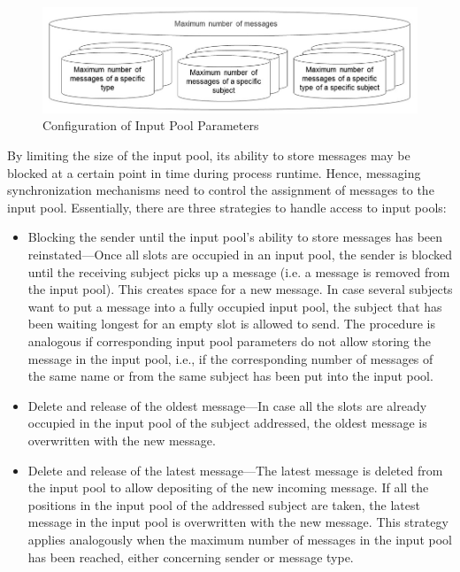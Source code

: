 \begin{figure}[htbp]
	\centering
	\includegraphics[width=12cm]{Figures/Ontology/SubjectInteraction/input-pool-informal.jpg}
	\caption[Input Pool]{Configuration of Input Pool Parameters}
	\label{fig:input-pool}
\end{figure}

By limiting the size of the input pool, its ability to store messages may be blocked at a certain point in time during process runtime. Hence, messaging synchronization mechanisms need to control the assignment of messages to the input pool. Essentially, there are three strategies to handle access to input pools:

\begin{itemize}
	\item Blocking the sender until the input pool’s ability to store messages has been reinstated---Once all slots are occupied in an input pool, the sender is blocked until the receiving subject picks up a message (i.e. a message is removed from the input pool). This creates space for a new message. In case several subjects want to put a message into a fully occupied input pool, the subject that has been waiting longest for an empty slot is allowed to send. The procedure is analogous if corresponding input pool parameters do not allow storing the message in the input pool, i.e., if the corresponding number of messages of the same name or from the same subject has been put into the input pool.
	\item Delete and release of the oldest message---In case all the slots are already occupied in the input pool of the subject addressed, the oldest message is overwritten with the new message.
	\item Delete and release of the latest message---The latest message is deleted from the input pool to allow depositing of the new incoming message. If all the positions in the input pool of the addressed subject are taken, the latest message in the input pool is overwritten with the new message. This strategy applies analogously when the maximum number of messages in the input pool has been reached, either concerning sender or message type.
\end{itemize}

